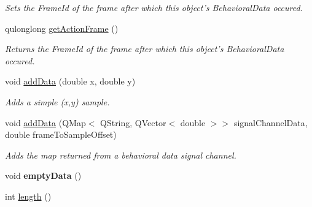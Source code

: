 \begin{DoxyCompactItemize}
\begin{DoxyCompactList}\small\item\em Sets the Frame\-Id of the frame after which this object's Behavioral\-Data occured. \end{DoxyCompactList}\item 
\hypertarget{class_picto_1_1_behavioral_data_unit_package_ad4bed533a799c8142d6ca9bb32bb77b7}{qulonglong \hyperlink{class_picto_1_1_behavioral_data_unit_package_ad4bed533a799c8142d6ca9bb32bb77b7}{get\-Action\-Frame} ()}\label{class_picto_1_1_behavioral_data_unit_package_ad4bed533a799c8142d6ca9bb32bb77b7}

\begin{DoxyCompactList}\small\item\em Returns the Frame\-Id of the frame after which this object's Behavioral\-Data occured. \end{DoxyCompactList}\item 
\hypertarget{class_picto_1_1_behavioral_data_unit_package_aef8e8c9f830ee39eba3f83b96707a75c}{void \hyperlink{class_picto_1_1_behavioral_data_unit_package_aef8e8c9f830ee39eba3f83b96707a75c}{add\-Data} (double x, double y)}\label{class_picto_1_1_behavioral_data_unit_package_aef8e8c9f830ee39eba3f83b96707a75c}

\begin{DoxyCompactList}\small\item\em Adds a simple (x,y) sample. \end{DoxyCompactList}\item 
void \hyperlink{class_picto_1_1_behavioral_data_unit_package_a56d01860a83cf8c13601d669084eb7db}{add\-Data} (Q\-Map$<$ Q\-String, Q\-Vector$<$ double $>$$>$ signal\-Channel\-Data, double frame\-To\-Sample\-Offset)
\begin{DoxyCompactList}\small\item\em Adds the map returned from a behavioral data signal channel. \end{DoxyCompactList}\item 
\hypertarget{class_picto_1_1_behavioral_data_unit_package_a57aa4043238b3eca2f2e39481a0363d0}{void {\bfseries empty\-Data} ()}\label{class_picto_1_1_behavioral_data_unit_package_a57aa4043238b3eca2f2e39481a0363d0}

\item 
\hypertarget{class_picto_1_1_behavioral_data_unit_package_a25eb32678a26a90e6e13df8e871da8f7}{int \hyperlink{class_picto_1_1_behavioral_data_unit_package_a25eb32678a26a90e6e13df8e871da8f7}{length} ()}\label{class_picto_1_1_behavioral_data_unit_package_a25eb32678a26a90e6e13df8e871da8f7}


\end{DoxyCompactItemize}

